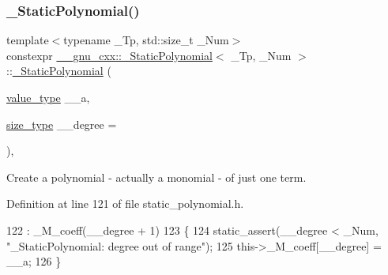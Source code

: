 \subsubsection{\texorpdfstring{\+\_\+\+Static\+Polynomial()}{\_StaticPolynomial()}\hspace{0.1cm}{\footnotesize\ttfamily [6/7]}}
{\footnotesize\ttfamily template$<$typename \+\_\+\+Tp, std\+::size\+\_\+t \+\_\+\+Num$>$ \\
constexpr \hyperlink{class____gnu__cxx_1_1__StaticPolynomial}{\+\_\+\+\_\+gnu\+\_\+cxx\+::\+\_\+\+Static\+Polynomial}$<$ \+\_\+\+Tp, \+\_\+\+Num $>$\+::\hyperlink{class____gnu__cxx_1_1__StaticPolynomial}{\+\_\+\+Static\+Polynomial} (\begin{DoxyParamCaption}\item[{\hyperlink{class____gnu__cxx_1_1__StaticPolynomial_af23110f5a002cd6caa3542df7cf35284}{value\+\_\+type}}]{\+\_\+\+\_\+a,  }\item[{\hyperlink{class____gnu__cxx_1_1__StaticPolynomial_a3384ce6a956ad398fc995e6ee53b2b18}{size\+\_\+type}}]{\+\_\+\+\_\+degree = {} }\end{DoxyParamCaption})\hspace{0.3cm}{\ttfamily [inline]}, {\ttfamily [explicit]}}

Create a polynomial -\/ actually a monomial -\/ of just one term. 

Definition at line 121 of file static\+\_\+polynomial.\+h.


\begin{DoxyCode}
122       : \_M\_coeff(\_\_degree + 1)
123       \{
124         static\_assert(\_\_degree < \_Num, \textcolor{stringliteral}{"\_StaticPolynomial: degree out of range"});
125         this->\_M\_coeff[\_\_degree] = \_\_a;
126       \}
\end{DoxyCode}
\mbox{\label{class____gnu__cxx_1_1__StaticPolynomial_aaa1495bb871e3f2dbcfa7c88553f9ee1}} 

